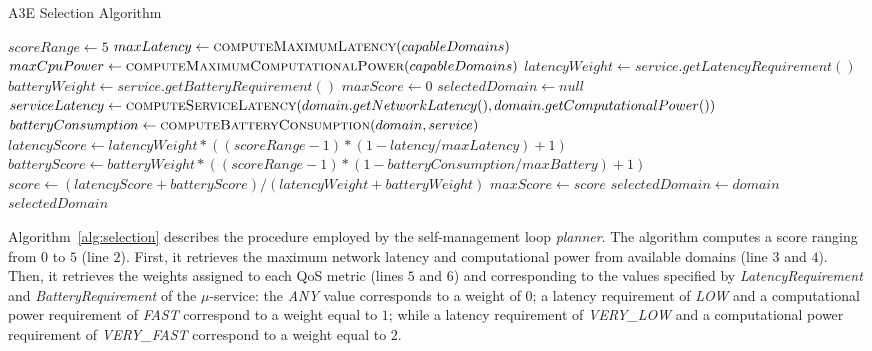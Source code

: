 \setlength{\textfloatsep}{5pt}%
{\scriptsize
\begin{algorithm}[th]
	\caption{A3E Selection Algorithm}
	\label{alg:selection}
	\begin{algorithmic}[1]		
		\State $scoreRange \gets 5$
		\State $maxLatency \gets \Call{computeMaximumLatency}{capableDomains}$
		\State $maxCpuPower \gets \Call{computeMaximumComputationalPower}{capableDomains}$
		\State $latencyWeight \gets service.getLatencyRequirement()$
		\State $batteryWeight \gets service.getBatteryRequirement()$
		\State $maxScore \gets 0$
		\State $selectedDomain \gets null$
		\State $serviceLatency \gets 
		\Call{computeServiceLatency}{domain.getNetworkLatency(),domain.getComputationalPower()}$
		\State $batteryConsumption \gets%
		\Call{computeBatteryConsumption}{domain, service}$
		\State $latencyScore \gets latencyWeight*((scoreRange-1)*(1 - latency/maxLatency)+1)$ 		
		\State $batteryScore \gets batteryWeight*((scoreRange-1)*(1 - batteryConsumption/maxBattery)+1)$ 
		\State $score \gets (latencyScore + batteryScore) / (latencyWeight + batteryWeight)$
		\State $maxScore \gets score$
		\State $selectedDomain \gets domain$
		\EndIf
		\EndFor 
		\State \Return $selectedDomain$
		\EndFunction
	\end{algorithmic}
\end{algorithm}
}%

Algorithm~\ref{alg:selection} describes the procedure employed by the self-management loop \textit{planner}. The algorithm computes a score ranging from $0$ to $5$ (line $2$). First, it retrieves the maximum network latency and computational power from available domains (line $3$ and $4$). Then, it retrieves the weights assigned to each QoS metric (lines $5$ and $6$) and corresponding to  the values specified by \textit{LatencyRequirement} and \textit{BatteryRequirement} of the $\mu$-service: the \textit{ANY} value corresponds to a weight of $0$; a latency requirement of \textit{LOW} and a computational power requirement of \textit{FAST} correspond to a weight equal to $1$; while a latency requirement of \textit{VERY\_LOW} and a computational power requirement of \textit{VERY\_FAST} correspond to a weight equal to $2$. 

